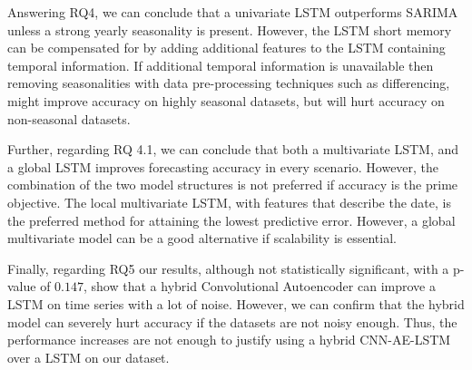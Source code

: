 Answering RQ4, we can conclude that a univariate LSTM outperforms SARIMA
unless a strong yearly seasonality is present. However, the LSTM short memory can be
compensated for by adding additional features to the LSTM containing temporal information.
If additional temporal information is unavailable then removing seasonalities with data pre-processing techniques such as differencing,
might improve accuracy on highly seasonal datasets, but will hurt accuracy on non-seasonal datasets.

Further, regarding RQ 4.1, we can conclude that both a multivariate LSTM,
and a global LSTM improves forecasting accuracy in every scenario.
However, the combination of the two model structures is not preferred if accuracy is the prime objective.
The local multivariate LSTM, with features that describe the date, is the preferred method for attaining the lowest predictive error.
However, a global multivariate model can be a good alternative if scalability is essential.

Finally, regarding RQ5  our results,
although not statistically significant, with a p-value of $0.147$,
show that a hybrid Convolutional Autoencoder can improve a LSTM on time series
with a lot of noise.
However, we can confirm that the hybrid model can severely
hurt accuracy if the datasets are not noisy enough.
Thus, the performance increases are not enough to justify using
a hybrid CNN-AE-LSTM over a LSTM on our dataset.



